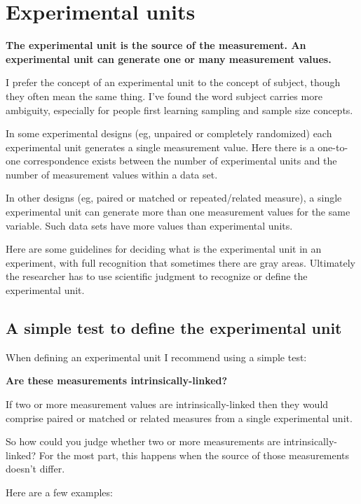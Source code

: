 \documentclass[]{book}
\begin{document}
\hypertarget{experimental-units}{%
\section{Experimental units}\label{experimental-units}}

\textbf{The experimental unit is the source of the measurement. An experimental unit can generate one or many measurement values.}

I prefer the concept of an experimental unit to the concept of subject, though they often mean the same thing. I've found the word subject carries more ambiguity, especially for people first learning sampling and sample size concepts.

In some experimental designs (eg, unpaired or completely randomized) each experimental unit generates a single measurement value. Here there is a one-to-one correspondence exists between the number of experimental units and the number of measurement values within a data set.

In other designs (eg, paired or matched or repeated/related measure), a single experimental unit can generate more than one measurement values for the same variable. Such data sets have more values than experimental units.

Here are some guidelines for deciding what is the experimental unit in an experiment, with full recognition that sometimes there are gray areas. Ultimately the researcher has to use scientific judgment to recognize or define the experimental unit.

\hypertarget{a-simple-test-to-define-the-experimental-unit}{%
\subsection{A simple test to define the experimental unit}\label{a-simple-test-to-define-the-experimental-unit}}

When defining an experimental unit I recommend using a simple test:

\textbf{Are these measurements intrinsically-linked?}

If two or more measurement values are intrinsically-linked then they would comprise paired or matched or related measures from a single experimental unit.

So how could you judge whether two or more measurements are intrinsically-linked? For the most part, this happens when the source of those measurements doesn't differ.

Here are a few examples:
\end{document}
